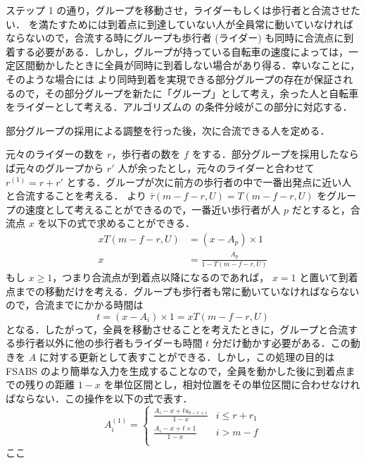 ステップ 1 の通り，グループを移動させ，ライダーもしくは歩行者と合流させたい．  を満たすためには到着点に到達していない人が全員常に動いていなければならないので，合流する時にグループも歩行者 (ライダー) も同時に合流点に到着する必要がある．しかし，グループが持っている自転車の速度によっては，一定区間動かしたときに全員が同時に到着しない場合があり得る．幸いなことに，そのような場合には  より同時到着を実現できる部分グループの存在が保証されるので，その部分グループを新たに「グループ」として考え，余った人と自転車をライダーとして考える．アルゴリズムの  の条件分岐がこの部分に対応する．

部分グループの採用による調整を行った後，次に合流できる人を定める．

元々のライダーの数を $r$，歩行者の数を $f$ をする．部分グループを採用したならば元々のグループから $r\prime$ 人が余ったとし，元々のライダーと合わせて $r^{(1)} = r + r\prime$ とする．グループが次に前方の歩行者の中で一番出発点に近い人と合流することを考える．  より $\bar\tau(m - f - r, U) = T(m - f - r, U)$ をグループの速度として考えることができるので，一番近い歩行者が人 $p$ だとすると，合流点 $x$ を以下の式で求めることができる．
\begin{align}
  xT(m - f - r, U) &= (x - A_p) \times 1 \\
  x &= \frac{A_p}{1 - T(m - f - r, U)}
\end{align}
もし $x \geq 1$，つまり合流点が到着点以降になるのであれば， $x = 1$ と置いて到着点までの移動だけを考える．グループも歩行者も常に動いていなければならないので，合流までにかかる時間は
\begin{equation}
  t = (x - A_i) \times 1 = xT(m - f - r, U)
\end{equation}
となる．したがって，全員を移動させることを考えたときに，グループと合流する歩行者以外に他の歩行者もライダーも時間 $t$ 分だけ動かす必要がある．この動きを $A$ に対する更新として表すことができる．しかし，この処理の目的は FSABS のより簡単な入力を生成することなので，全員を動かした後に到着点までの残りの距離 $1 - x$ を単位区間とし，相対位置をその単位区間に合わせなければならない．この操作を以下の式で表す．
\begin{equation}
  A^{(1)}_i = \begin{cases}
    \frac{A_i - x + tu_{b - r + i}}{1 - x} & i \leq r + r_1\\
    \frac{A_i - x + t \times 1}{1 - x} & i > m - f \\
  \end{cases}
\end{equation}
ここ


